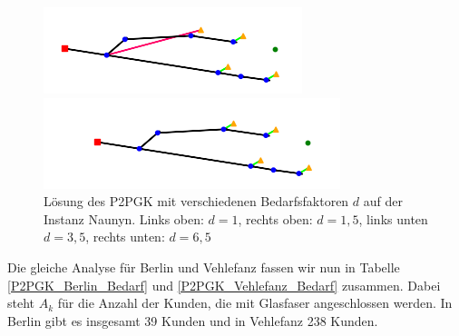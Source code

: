 \documentclass[11pt,a4paper]{article}
\theoremstyle{my_th_style1}
\begin{document}
\begin{figure}[h]
\begin{minipage}[b]{0.4\textwidth}
		\includegraphics[width=\textwidth]{./Bilder/P2PGK_Naunyn_demand3_5_duration0}
	\end{minipage}
	\begin{minipage}[b]{0.4\textwidth}
		\includegraphics[width=\textwidth]{./Bilder/P2PGK_Naunyn_demand6_5_duration0}
	\end{minipage}
	\caption{Lösung des P2PGK mit verschiedenen Bedarfsfaktoren $d$ auf der Instanz Naunyn. Links oben: $d=1$, rechts oben: $d=1,5$, links unten $d=3,5$, rechts unten: $d=6,5$}
	\label{P2PGK_Naunyn_Bedarf}
\end{figure}

Die gleiche Analyse für Berlin und Vehlefanz fassen wir nun in Tabelle \ref{P2PGK_Berlin_Bedarf} und \ref{P2PGK_Vehlefanz_Bedarf} zusammen. Dabei steht $A_k$ für die Anzahl der Kunden, die mit Glasfaser angeschlossen werden. In Berlin gibt es insgesamt 39 Kunden und in Vehlefanz 238 Kunden.
\end{document}
